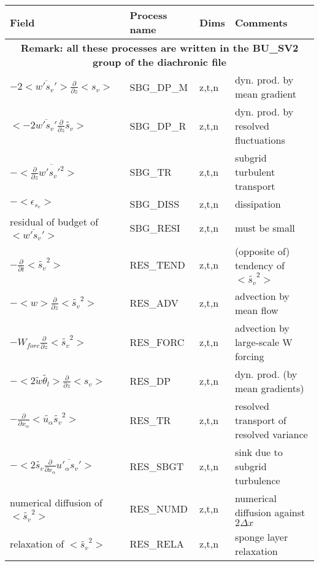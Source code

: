 \begingroup
\renewcommand\arraystretch{1.5}
\begin{longtable}[c]{|p{}|p{}|p{}|p{}|}
\hline
Field & Process name & Dims & Comments \\
\hline \hline
\endhead
\multicolumn{4}{|c|}{\textbf{Remark: all these processes are written in the BU\_SV2 group of the diachronic file}} \\
\hline
\endfoot
$- 2 <\overline{w's_v'}>\frac{\partial }{\partial z}<s_v>$         & SBG\_DP\_M & z,t,n & dyn. prod. by mean gradient \\\hline
$<-2 \overline{w's_v'}\frac{\partial}{\partial z}\tilde{s_v}>$     & SBG\_DP\_R & z,t,n & dyn. prod. by resolved fluctuations\\\hline
$-<\frac{\partial}{\partial z}\overline{w's_v'^2}>$                & SBG\_TR    & z,t,n & subgrid turbulent transport\\\hline
$-<\epsilon_{s_v}>$                                                & SBG\_DISS  & z,t,n & dissipation \\\hline
{\rm residual of budget of} $<\overline{w's_v'}>$                  & SBG\_RESI  & z,t,n & must be small \\\hline
$-\frac{\partial }{\partial t}<\tilde{s_v}^2>$                     & RES\_TEND  & z,t,n & (opposite of) tendency of $<\tilde{s_v}^2>$\\\hline
$-<w>\frac{\partial}{\partial z}<\tilde{s_v}^2>$                   & RES\_ADV   & z,t,n & advection by mean flow\\\hline
$-W_{forc}\frac{\partial}{\partial z}<\tilde{s_v}^2>$              & RES\_FORC  & z,t,n & advection by large-scale W forcing\\\hline
$-< 2 \tilde{w}\tilde{\theta_l}>\frac{\partial }{\partial z}<s_v>$ & RES\_DP    & z,t,n & dyn. prod. (by mean gradients) \\\hline
$-\frac{\partial}{\partial x_\alpha} <\tilde{u_\alpha} \tilde{s_v}^2>$ & RES\_TR   & z,t,n & resolved transport of resolved variance \\\hline
$- <2 \tilde{s_v}\frac{\partial}{\partial x_\alpha}\overline{u'_\alpha s_v'}>$ & RES\_SBGT & z,t,n & sink due to subgrid turbulence \\\hline
{\rm numerical diffusion of } $<\tilde{s_v}^2>$                    & RES\_NUMD  & z,t,n & numerical diffusion against $2\Delta x$ \\\hline
{\rm relaxation of }$<\tilde{s_v}^2>$                              & RES\_RELA  & z,t,n & sponge layer relaxation \\\hline

\end{longtable}
